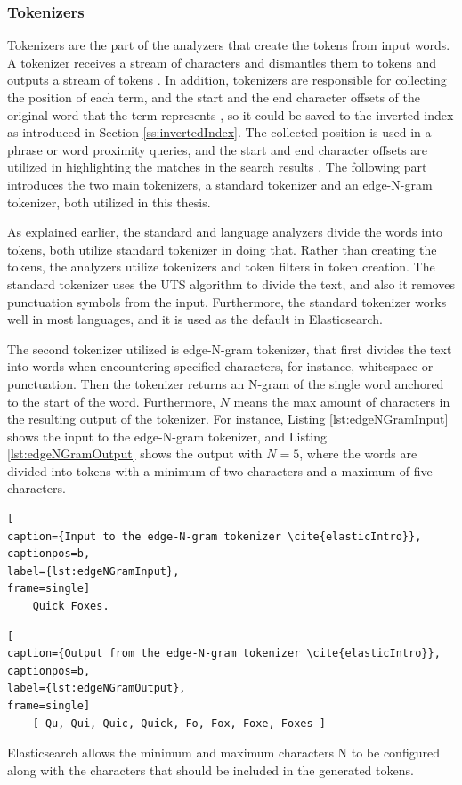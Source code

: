 \subsubsection{Tokenizers}

Tokenizers are the part of the analyzers that create the tokens from input words.
A tokenizer receives a stream of characters and dismantles them to tokens and outputs a stream
of tokens \cite{elasticIntro}.
In addition, tokenizers are responsible for collecting the position of each term, and the start 
and the end character offsets of the original word that the term represents \cite{elasticIntro}, 
so it could be saved to the inverted index as introduced in Section \ref{ss:invertedIndex}.
The collected position is used in a phrase or word proximity queries, and 
the start and end character offsets are utilized in highlighting the matches in the
search results \cite{elasticIntro}.
The following part introduces the two main tokenizers, a standard tokenizer and 
an edge-N-gram tokenizer, both utilized in this thesis.


As explained earlier, the standard and language analyzers divide the words into tokens,
both utilize standard tokenizer in doing that. 
Rather than creating the tokens, the analyzers utilize tokenizers and token filters in token creation.
The standard tokenizer uses the UTS algorithm to divide the text,
and also it removes punctuation symbols from the input.
Furthermore, the standard tokenizer works well in most languages, and it is used as the default in Elasticsearch.
\cite{elasticIntro}


The second tokenizer utilized is edge-N-gram tokenizer, that first divides the text into words when encountering
specified characters, for instance, whitespace or punctuation. 
Then the tokenizer returns an N-gram of the single word anchored to the start of the word.
Furthermore, $N$ means the max amount of characters in the resulting output of the tokenizer.
For instance, Listing \ref{lst:edgeNGramInput} shows the input to the edge-N-gram tokenizer, and
Listing \ref{lst:edgeNGramOutput} shows the output with $N = 5$, where the words are divided into tokens 
with a minimum of two characters and a maximum of five characters.
\begin{lstlisting}[
caption={Input to the edge-N-gram tokenizer \cite{elasticIntro}},
captionpos=b,
label={lst:edgeNGramInput},
frame=single]
    Quick Foxes.
\end{lstlisting}
\begin{lstlisting}[
caption={Output from the edge-N-gram tokenizer \cite{elasticIntro}},
captionpos=b,
label={lst:edgeNGramOutput},
frame=single]
    [ Qu, Qui, Quic, Quick, Fo, Fox, Foxe, Foxes ]
\end{lstlisting}
Elasticsearch allows the minimum and maximum characters N to be configured along with the characters 
that should be included in the generated tokens.
\cite{elasticIntro}


